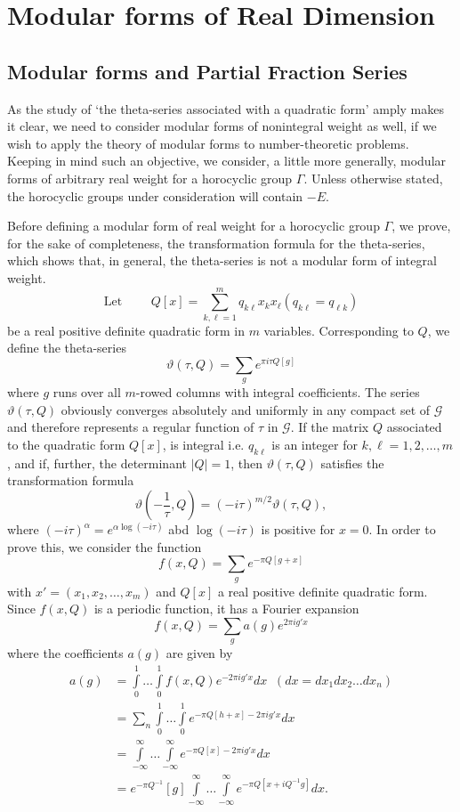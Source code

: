 \chapter{Modular forms of Real Dimension}\label{chap3}

\section{Modular forms and Partial Fraction Series}\label{chap3:sec1}\pageoriginale

As the study of `the theta-series associated with a quadratic form'
amply makes it clear, we need to consider modular forms of nonintegral
weight as well, if we wish to apply the theory of modular forms to
number-theoretic problems. Keeping in mind such an objective, we
consider, a little more generally, modular forms of arbitrary real
weight for a horocyclic group $\Gamma$. Unless otherwise stated, the
horocyclic groups under consideration will contain $-E$.

Before defining a modular form of real weight for a horocyclic group
$\Gamma$, we prove, for the sake of completeness, the transformation
formula for the theta-series, which shows that, in general, the
theta-series is not a modular form of integral weight.
$$
\text{Let } \qquad Q [x] = \sum^m_{k,\ell=1}q_{k\ell}
x_kx_{\ell}(q_{k\ell}=q_{\ell k}) 
$$
be a real positive definite quadratic form in $m$
variables. Corresponding to $Q$, we define the theta-series
$$
\vartheta(\tau, Q) = \sum_g e^{\pi i \tau Q[g]}
$$
where $g$ runs over all $m$-rowed columns with integral
coefficients. The series $\vartheta(\tau,Q)$ obviously converges
absolutely and uniformly in any compact set of $\mathscr{G}$ and
therefore represents a regular function of $\tau$ in $\mathscr{G}$. If
the \pageoriginale matrix $Q$ associated to the quadratic form $Q[x]$,
is integral i.e. $q_{k\ell}$ is an integer for $k,\ell=1,2,\ldots, m$,
and if, further, the determinant $|Q|=1$, then $\vartheta(\tau,Q)$
satisfies the transformation formula
$$
\vartheta\left(-\frac{1}{\tau}, Q\right) = (-i\tau)^{m/2} \vartheta(\tau,Q),
$$
where $(-i\tau)^{\alpha}=e^{\alpha \log(-i\tau)}$ abd $\log(-i\tau)$
is positive for $x=0$. In order to prove this, we consider the
function 
$$
f(x,Q) = \sum_g e^{-\pi Q[g+x]}
$$
with $x'=(x_1, x_2,\ldots, x_m)$ and $Q[x]$ a real positive definite
quadratic form. Since $f(x,Q)$ is a periodic function, it has a
Fourier expansion 
$$
f(x,Q) = \sum_g a(g)e^{2\pi i g'x}
$$
where the coefficients $a(g)$ are given by 
\begin{align*}
a(g) & = \int\limits^1_0 \ldots \int\limits^1_0 f(x,Q)e^{-2\pi i g'x}
dx \;\; (dx=dx_1dx_2\ldots dx_n)\\
& = \sum_n\int\limits^1_0 \ldots \int\limits^1_0 e^{-\pi Q[h+x]-2\pi i
g'x} dx\\
& = \int\limits^{\infty}_{-\infty} \ldots \int\limits^{\infty}
_{-\infty} e^{-\pi Q[x]-2\pi i g'x}dx\\
& = e^{-\pi Q^{-1}} [g] \int\limits^{\infty}_{-\infty} \ldots
\int\limits^{\infty}_{-\infty} e^{-\pi Q[x+iQ^{-1}g]}dx.
\end{align*}

